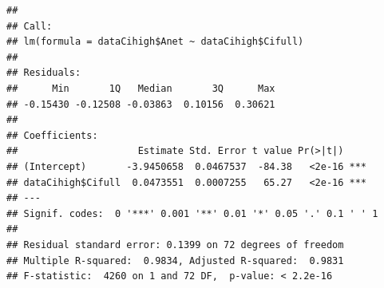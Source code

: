 \documentclass[
]{krantz}
\makeatletter
\newenvironment{Shaded}{\begin{snugshade}}{\end{snugshade}}
\newcommand{\DecValTok}[1]{\textcolor[rgb]{0.00,0.00,0.81}{#1}}
\newcommand{\KeywordTok}[1]{\textcolor[rgb]{0.13,0.29,0.53}{\textbf{#1}}}
\newcommand{\NormalTok}[1]{#1}
\newcommand{\OperatorTok}[1]{\textcolor[rgb]{0.81,0.36,0.00}{\textbf{#1}}}
\newcommand{\StringTok}[1]{\textcolor[rgb]{0.31,0.60,0.02}{#1}}
\newenvironment{kframe}{%
\medskip{}
\setlength{\fboxsep}{.8em}
 \def\at@end@of@kframe{}%
 \ifinner\ifhmode%
  \def\at@end@of@kframe{\end{minipage}}%
  \begin{minipage}{\columnwidth}%
 \fi\fi%
 \def\FrameCommand##1{\hskip\@totalleftmargin \hskip-\fboxsep
 \colorbox{shadecolor}{##1}\hskip-\fboxsep
     \hskip-\linewidth \hskip-\@totalleftmargin \hskip\columnwidth}%
 \MakeFramed {\advance\hsize-\width
   \@totalleftmargin\z@ \linewidth\hsize
   \@setminipage}}%
 {\par\unskip\endMakeFramed%
 \at@end@of@kframe}
\renewenvironment{Shaded}{\begin{kframe}}{\end{kframe}}
\makeatother
\begin{document}
\begin{Shaded}
\end{Shaded}

\begin{verbatim}
## 
## Call:
## lm(formula = dataCihigh$Anet ~ dataCihigh$Cifull)
## 
## Residuals:
##      Min       1Q   Median       3Q      Max 
## -0.15430 -0.12508 -0.03863  0.10156  0.30621 
## 
## Coefficients:
##                     Estimate Std. Error t value Pr(>|t|)    
## (Intercept)       -3.9450658  0.0467537  -84.38   <2e-16 ***
## dataCihigh$Cifull  0.0473551  0.0007255   65.27   <2e-16 ***
## ---
## Signif. codes:  0 '***' 0.001 '**' 0.01 '*' 0.05 '.' 0.1 ' ' 1
## 
## Residual standard error: 0.1399 on 72 degrees of freedom
## Multiple R-squared:  0.9834,	Adjusted R-squared:  0.9831 
## F-statistic:  4260 on 1 and 72 DF,  p-value: < 2.2e-16
\end{verbatim}
\end{document}
